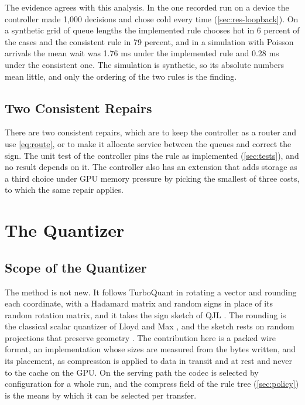 The evidence agrees with this analysis. In the one recorded run on a device the controller made
1,000 decisions and chose cold every time (\cref{sec:res-loopback}). On a
synthetic grid of queue lengths the implemented rule chooses hot in 6 percent
of the cases and the consistent rule in 79 percent, and in a simulation with
Poisson arrivals the mean wait was 1.76 ms under the implemented rule and
0.28 ms under the consistent one. The simulation is synthetic, so its absolute numbers mean little, and only the
ordering of the two rules is the finding.

\subsection{Two Consistent Repairs}

There are two consistent repairs, which are to keep the controller as a router
and use \cref{eq:route}, or to make it allocate service between the queues
and correct the sign. The unit test of the controller pins the rule as
implemented (\cref{sec:tests}), and no result depends on it. The controller also has an extension that adds storage as a
third choice under GPU memory pressure by picking the smallest of three
costs, to which the same repair applies.


\section{The Quantizer}
\label{ch:shrink}

\subsection{Scope of the Quantizer}

The method is not new. It follows TurboQuant \citep{zandieh2025turboquant}
in rotating a vector and rounding each coordinate, with a Hadamard matrix and
random signs in place of its random rotation matrix, and it takes the sign
sketch of QJL \citep{zandieh2024qjl}. The rounding is the classical scalar
quantizer of Lloyd and Max \citep{lloyd1982,max1960}, and the sketch rests on random projections
that preserve geometry \citep{johnson1984}. The contribution here is a packed wire format, an implementation whose sizes
are measured from the bytes written, and its placement, as
compression is applied to data in transit and at rest and never to the cache
on the GPU. On the serving path the codec is selected by configuration for a
whole run, and the compress field of the rule tree (\cref{sec:policy}) is the
means by which it can be selected per transfer.

